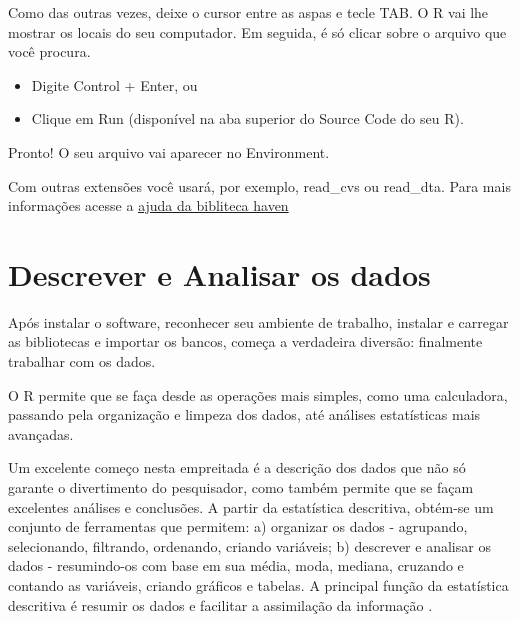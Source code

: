 \documentclass[
  brazil,
]{book}
\providecommand{\tightlist}{%
  \setlength{\itemsep}{0pt}\setlength{\parskip}{0pt}}
\begin{document}
Como das outras vezes, deixe o cursor entre as aspas e tecle TAB. O R vai lhe mostrar os locais do seu computador. Em seguida, é só clicar sobre o arquivo que você procura.

\begin{itemize}
\tightlist
\item
  Digite Control + Enter, ou
\item
  Clique em Run (disponível na aba superior do Source Code do seu R).
\end{itemize}

Pronto! O seu arquivo vai aparecer no Environment.

Com outras extensões você usará, por exemplo, read\_cvs ou read\_dta. Para mais informações acesse a \href{https://haven.tidyverse.org/}{ajuda da bibliteca haven}

\hypertarget{descrever-e-analisar-os-dados}{%
\chapter{Descrever e Analisar os dados}\label{descrever-e-analisar-os-dados}}

Após instalar o software, reconhecer seu ambiente de trabalho, instalar e carregar as bibliotecas e importar os bancos, começa a verdadeira diversão: finalmente trabalhar com os dados.

O R permite que se faça desde as operações mais simples, como uma calculadora, passando pela organização e limpeza dos dados, até análises estatísticas mais avançadas.

Um excelente começo nesta empreitada é a descrição dos dados que não só garante o divertimento do pesquisador, como também permite que se façam excelentes análises e conclusões. A partir da estatística descritiva, obtém-se um conjunto de ferramentas que permitem: a) organizar os dados - agrupando, selecionando, filtrando, ordenando, criando variáveis; b) descrever e analisar os dados - resumindo-os com base em sua média, moda, mediana, cruzando e contando as variáveis, criando gráficos e tabelas. A principal função da estatística descritiva é resumir os dados e facilitar a assimilação da informação \citep{agresti_metodos_2012}.
\end{document}
